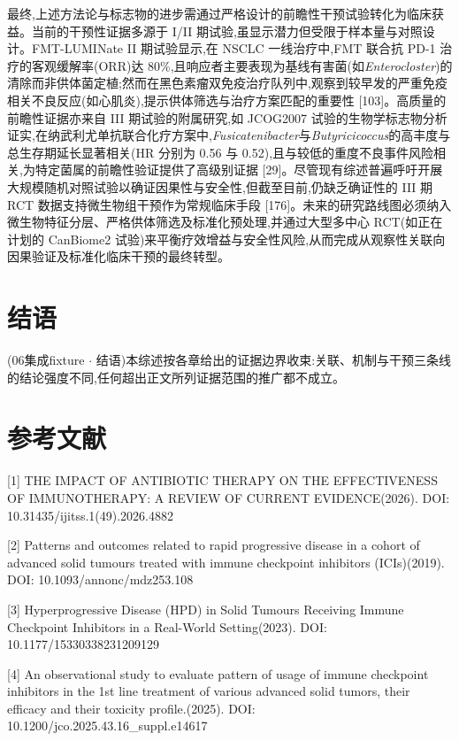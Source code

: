 \documentclass[11pt]{article}
\begin{document}
最终,上述方法论与标志物的进步需通过严格设计的前瞻性干预试验转化为临床获益。当前的干预性证据多源于 I/II 期试验,虽显示潜力但受限于样本量与对照设计。FMT-LUMINate II 期试验显示,在 NSCLC 一线治疗中,FMT 联合抗 PD-1 治疗的客观缓解率(ORR)达 80\%,且响应者主要表现为基线有害菌(如\emph{Enterocloster})的清除而非供体菌定植;然而在黑色素瘤双免疫治疗队列中,观察到较早发的严重免疫相关不良反应(如心肌炎),提示供体筛选与治疗方案匹配的重要性 {[}103{]}。高质量的前瞻性证据亦来自 III 期试验的附属研究,如 JCOG2007 试验的生物学标志物分析证实,在纳武利尤单抗联合化疗方案中,\emph{Fusicatenibacter}与\emph{Butyricicoccus}的高丰度与总生存期延长显著相关(HR 分别为 0.56 与 0.52),且与较低的重度不良事件风险相关,为特定菌属的前瞻性验证提供了高级别证据 {[}29{]}。尽管现有综述普遍呼吁开展大规模随机对照试验以确证因果性与安全性,但截至目前,仍缺乏确证性的 III 期 RCT 数据支持微生物组干预作为常规临床手段 {[}176{]}。未来的研究路线图必须纳入微生物特征分层、严格供体筛选及标准化预处理,并通过大型多中心 RCT(如正在计划的 CanBiome2 试验)来平衡疗效增益与安全性风险,从而完成从观察性关联向因果验证及标准化临床干预的最终转型。

\section{结语}\label{ux7ed3ux8bed}

(06集成fixture \(\cdot\) 结语)本综述按各章给出的证据边界收束:关联、机制与干预三条线的结论强度不同,任何超出正文所列证据范围的推广都不成立。

\section{参考文献}\label{ux53c2ux8003ux6587ux732e}

{[}1{]} THE IMPACT OF ANTIBIOTIC THERAPY ON THE EFFECTIVENESS OF IMMUNOTHERAPY: A REVIEW OF CURRENT EVIDENCE(2026). DOI: 10.31435/ijitss.1(49).2026.4882

{[}2{]} Patterns and outcomes related to rapid progressive disease in a cohort of advanced solid tumours treated with immune checkpoint inhibitors (ICIs)(2019). DOI: 10.1093/annonc/mdz253.108

{[}3{]} Hyperprogressive Disease (HPD) in Solid Tumours Receiving Immune Checkpoint Inhibitors in a Real-World Setting(2023). DOI: 10.1177/15330338231209129

{[}4{]} An observational study to evaluate pattern of usage of immune checkpoint inhibitors in the 1st line treatment of various advanced solid tumors, their efficacy and their toxicity profile.(2025). DOI: 10.1200/jco.2025.43.16\_suppl.e14617
\end{document}
